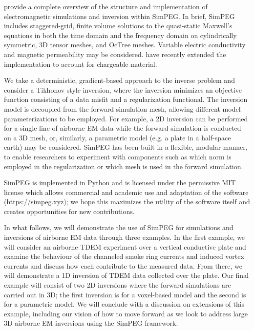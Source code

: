 \documentclass[paper]{geophysics}
\begin{document}
\cite{heagy2017} provide a complete overview of the structure and implementation of electromagnetic simulations and inversion within SimPEG. In brief, SimPEG includes staggered-grid, finite volume solutions to the quasi-static Maxwell's equations in both the time domain and the frequency domain on cylindrically symmetric, 3D tensor meshes, and OcTree meshes. Variable electric conductivity and magnetic permeability may be considered. \cite{kang2016} have recently extended the implementation to account for chargeable material.

We take a deterministic, gradient-based approach to the inverse problem and consider a Tikhonov style inversion, where the inversion minimizes an objective function consisting of a data misfit and a regularization functional. The inversion model is decoupled from the forward simulation mesh, allowing different model parameterizations to be employed. For example, a 2D inversion can be performed for a single line of airborne EM data while the forward simulation is conducted on a 3D mesh, or, similarly, a parametric model (e.g. a plate in a half-space earth) may be considered. SimPEG has been built in a flexible, modular manner, to enable researchers to experiment with components such as which norm is employed in the regularization or which mesh is used in the forward simulation.

SimPEG is implemented in Python and is licensed under the permissive MIT license which allows commercial and academic use and adaptation of the software (\href{https://simpeg.xyz}{https://simpeg.xyz}); we hope this maximizes the utility of the software itself and creates opportunities for new contributions.

In what follows, we will demonstrate the use of SimPEG for simulations and inversions of airborne EM data through three examples. In the first example, we will consider an airborne TDEM experiment over a vertical conductive plate and examine the behaviour of the channeled smoke ring currents and induced vortex currents and discuss how each contribute to the measured data. From there, we will demonstrate a 1D inversion of TDEM data collected over the plate. Our final example will consist of two 2D inversions where the forward simulations are carried out in 3D; the first inversion is for a voxel-based model and the second is for a parametric model. We will conclude with a discussion on extensions of this example, including our vision of how to move forward as we look to address large 3D airborne EM inversions using the SimPEG framework.
\end{document}
